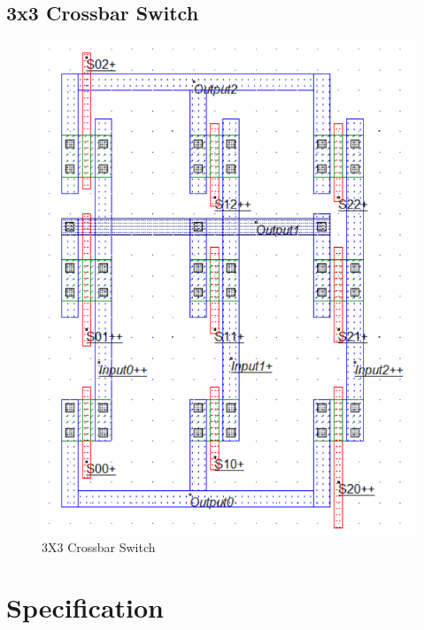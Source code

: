 \documentclass[a4paper,12pt]{article}
\begin{document}
	\subsection{3x3 Crossbar Switch}
		\begin{figure}[H]
		\centering
		\includegraphics[width=1.1\linewidth]{Images/3c}
		\caption{3X3 Crossbar Switch}
		\label{fig:2b}
	\end{figure}
	\section{Specification}
	
\end{document}
